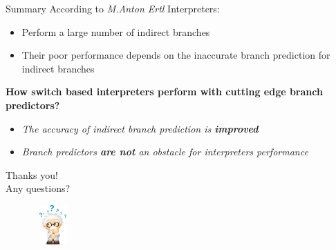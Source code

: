 \documentclass[10pt]{beamer}
\begin{document}
\begin{frame}{Summary}
	According to \textit{M.Anton Ertl\footnotemark[1]} Interpreters:
		\begin{itemize}
			\item{Perform a large number of indirect branches}
			\item{Their poor performance depends on the inaccurate branch prediction for indirect branches}
		\end{itemize}
		\textbf{How switch based interpreters perform with cutting edge branch predictors?}
		\begin{itemize}
			\item{\textit{The accuracy of indirect branch prediction is \textbf{improved}}}
			
			\begin{table}[]
				\captionsetup{font=small}
				\centering
			\caption{AVG MPKI of all benchmarks}
			\end{table}
			\item{\textit{Branch predictors \textbf{are not} an obstacle for interpreters performance}}
		\end{itemize}
\end{frame}
\begin{frame}[standout] 
    \huge \textlatin{Thanks you! }\\
    \large \textlatin{Any questions? }
    \begin{figure}
    	\includegraphics[width=1.5cm, height=1.5cm]{figures/questions.png}
    \end{figure}
\end{frame}
\end{document}
